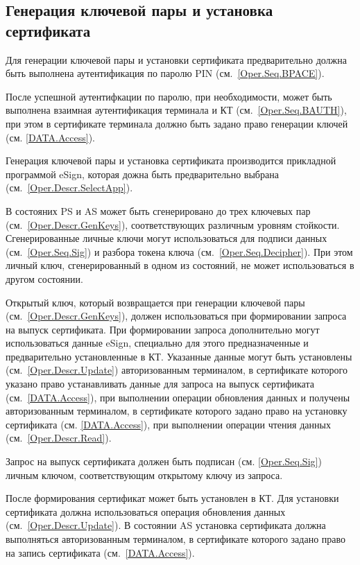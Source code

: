 \subsection{Генерация ключевой пары и установка сертификата}
\label{Oper.Seq.GeKeySetCert}

Для генерации ключевой пары и 
установки сертификата предварительно 
должна быть выполнена аутентификация по 
паролю PIN (см.~\ref{Oper.Seq.BPACE}).

После успешной аутентифкации по паролю,
при необходимости, может быть выполнена взаимная 
аутентификация терминала и КТ (см.~\ref{Oper.Seq.BAUTH}),
при этом в сертификате терминала должно быть задано
право генерации ключей (см. \ref{DATA.Access}).

Генерация ключевой пары и установка сертификата производится 
прикладной программой eSign, которая дожна быть предварительно 
выбрана (см.~\ref{Oper.Descr.SelectApp}). 

В состояних PS и AS может быть сгенерировано
до трех ключевых пар (см.~\ref{Oper.Descr.GenKeys}), 
соответствующих различным уровням стойкости. 
Сгенерированные личные ключи могут использоваться
для подписи данных (см.~\ref{Oper.Seq.Sig}) и разбора токена 
ключа (см.~\ref{Oper.Seq.Decipher}).
При этом личный ключ, сгенерированный в одном из состояний, 
не может использоваться в другом состоянии. 

Открытый ключ, который возвращается при генерации ключевой пары
(см.~\ref{Oper.Descr.GenKeys}), должен использоваться при формировании 
запроса на выпуск сертификата.
При формировании запроса дополнительно могут использоваться данные eSign, 
специально для этого предназначенные и предварительно
установленные в КТ.
Указанные данные могут быть установлены (см.~\ref{Oper.Descr.Update}) 
авторизованным терминалом, в сертификате которого указано право устанавливать данные 
для запроса на выпуск сертификата (см.~\ref{DATA.Access}), 
при выполнении операции обновления данных  
и получены авторизованным терминалом, в сертификате которого задано право на установку 
сертификата (см. \ref{DATA.Access}),
при выполнении операции чтения данных (см.~\ref{Oper.Descr.Read}).

Запрос на выпуск сертификата должен быть подписан (см. \ref{Oper.Seq.Sig})
личным ключом, соответствующим открытому ключу из запроса.

После формирования сертификат может быть установлен в КТ.
Для установки сертификата должна использоваться операция 
обновления данных (см.~\ref{Oper.Descr.Update}). 
В состоянии AS установка сертификата должна выполняться 
авторизованным терминалом, в сертификате которого задано право на 
запись сертификата (см.~\ref{DATA.Access}). 

